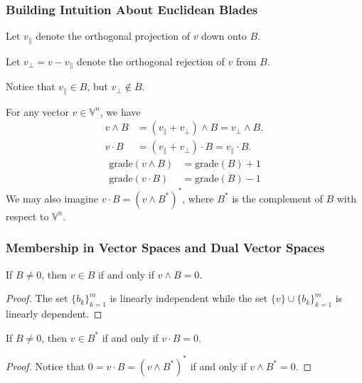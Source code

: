 \documentclass{beamer}
\newcommand{\V}{\mathbb{V}}
\newcommand{\grade}{\mbox{grade}}
\begin{document}
\begin{frame}
\frametitle{Building Intuition About Euclidean Blades}
Let $v_{\parallel}$ denote the orthogonal \alert{projection} of $v$ down onto $B$.\pause

Let $v_{\perp}=v-v_{\parallel}$ denote the orthogonal \alert{rejection} of $v$ from $B$.\pause

Notice that $v_{\parallel}\in B$, but $v_{\perp}\not\in B$.\pause

For any vector $v\in\V^n$, we have
\begin{align*}
v\wedge B &= (v_{\parallel} + v_{\perp})\wedge B = v_{\perp}\wedge B, \\
v\cdot B &= (v_{\parallel} + v_{\perp})\cdot B = v_{\parallel}\cdot B.
\end{align*}\pause
\begin{align*}
\grade(v\wedge B) &= \grade(B) + 1 \\
\grade(v\cdot B) &= \grade(B) - 1
\end{align*}\pause
We may also imagine $v\cdot B=(v\wedge B^*)^*$, where $B^*$ is the \alert{complement}
of $B$ with respect to $\V^n$.
\end{frame}

\begin{frame}
\frametitle{Membership in Vector Spaces and Dual Vector Spaces}
If $B\neq 0$, then $v\in B$ if and only if $v\wedge B=0$.\pause
\begin{proof}
The set $\{b_k\}_{k=1}^m$ is linearly independent while the set $\{v\}\cup\{b_k\}_{k=1}^m$ is linearly dependent.
\end{proof}\pause
If $B\neq 0$, then $v\in B^*$ if and only if $v\cdot B=0$.\pause
\begin{proof}
Notice that $0=v\cdot B=(v\wedge B^*)^*$ if and only if $v\wedge B^*=0$.
\end{proof}
\end{frame}
\end{document}
